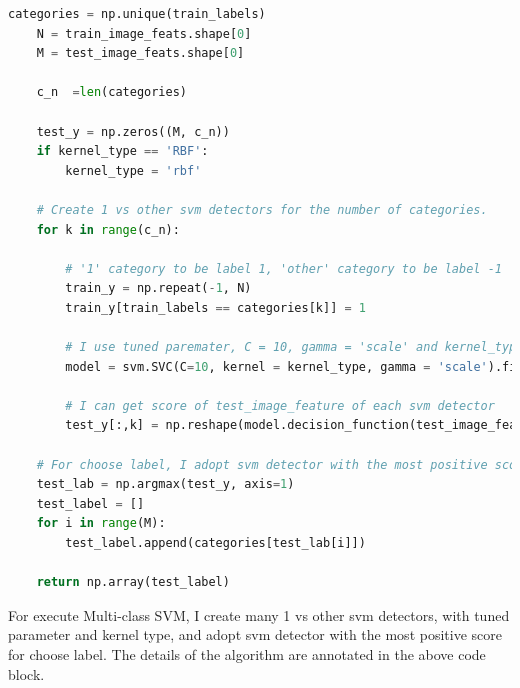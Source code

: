\lstset{numbers = left, numbersep=5pt, breaklines=true}
\begin{lstlisting}[language=python, caption = {Multi-class SVM}]
    categories = np.unique(train_labels)
    N = train_image_feats.shape[0]
    M = test_image_feats.shape[0]

    c_n  =len(categories)

    test_y = np.zeros((M, c_n))
    if kernel_type == 'RBF':
        kernel_type = 'rbf'

    # Create 1 vs other svm detectors for the number of categories.
    for k in range(c_n):
        
        # '1' category to be label 1, 'other' category to be label -1
        train_y = np.repeat(-1, N)
        train_y[train_labels == categories[k]] = 1

        # I use tuned paremater, C = 10, gamma = 'scale' and kernel_type
        model = svm.SVC(C=10, kernel = kernel_type, gamma = 'scale').fit(train_image_feats, train_y)

        # I can get score of test_image_feature of each svm detector
        test_y[:,k] = np.reshape(model.decision_function(test_image_feats), -1)

    # For choose label, I adopt svm detector with the most positive score.
    test_lab = np.argmax(test_y, axis=1)
    test_label = []
    for i in range(M):
        test_label.append(categories[test_lab[i]])

    return np.array(test_label)
\end{lstlisting}

For execute Multi-class SVM, I create many 1 vs other svm detectors, with tuned parameter and kernel type, and adopt svm detector with the most positive score for choose label. The details of the algorithm are annotated in the above code block.


\pagebreak
